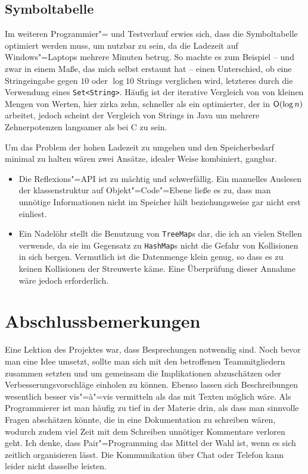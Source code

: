 \documentclass[10pt,a4paper,ngerman,titlepage,tocindentauto]{scrartcl}
\begin{document}
		\subsection[Symboltabelle]{\hypertarget{Offene_Baustellen_Symboltabelle}{Symboltabelle}}
			Im weiteren Programmier"= und Testverlauf erwies sich, dass die Symboltabelle optimiert werden muss, um
			nutzbar zu sein, da die Ladezeit auf Windows"=Laptops mehrere Minuten betrug. So machte es zum Beispiel -- und zwar in einem Maße,
			das mich selbst erstaunt hat -- einen Unterschied, ob eine Stringeingabe gegen $10$ oder $\log 10$ Strings verglichen
			wird, letzteres durch die Verwendung eines \verb|Set<String>|. Häufig ist der iterative Vergleich von von kleinen
			Mengen von Werten, hier zirka zehn, schneller als ein optimierter, der in $\textsf O\!\left(\log n\right)$ arbeitet,
			jedoch scheint der Vergleich von Strings in Java um mehrere Zehnerpotenzen langsamer als bei C zu sein.
			
			Um das Problem der hohen Ladezeit zu umgehen und den Speicherbedarf minimal zu halten wären zwei Ansätze,
			idealer Weise kombiniert, gangbar.
			\begin{itemize}
				\item
					Die Reflexions"=API ist zu mächtig und schwerfällig. Ein manuelles Auslesen der klassenstruktur
					auf Objekt"=Code"=Ebene ließe es zu, dass man unnötige Informationen nicht im Speicher hält beziehungsweise
					gar nicht erst einliest.
				\item
					Ein Nadelöhr stellt die
					Benutzung von \texttt{TreeMap}s dar, die ich an vielen Stellen verwende, da sie im Gegensatz zu \texttt{HashMap}s
					nicht die Gefahr von Kollisionen in sich bergen. Vermutlich ist die Datenmenge klein genug, so dass es zu keinen
					Kollisionen der Streuwerte käme. Eine Überprüfung dieser Annahme wäre jedoch erforderlich.
			\end{itemize}
	
	\section[Abschlussbemerkungen]{\hypertarget{Abschlussbemerkungen}{Abschlussbemerkungen}}
		Eine Lektion des Projektes war, dass Besprechungen notwendig sind. Noch bevor man eine Idee umsetzt, sollte man
		sich mit den betroffenen Teammitgliedern zusammen setzten und um gemeinsam die Implikationen abzuschätzen
		oder Verbesserungsvorschläge einholen zu können. Ebenso lassen sich Beschreibungen wesentlich besser vis"=à"=vis
		vermitteln als das mit Texten möglich wäre. Als Programmierer ist man häufig zu tief in der Materie drin, als dass
		man sinnvolle Fragen abschätzen könnte, die in eine Dokumentation zu schreiben wären, wodurch zudem viel Zeit
		mit dem Schreiben unnötiger Kommentare verloren geht. Ich denke, dass Pair"=Programming das Mittel der Wahl ist,
		wenn es sich zeitlich organisieren lässt. Die Kommunikation über Chat oder Telefon kann leider nicht dasselbe leisten.
		
\end{document}
